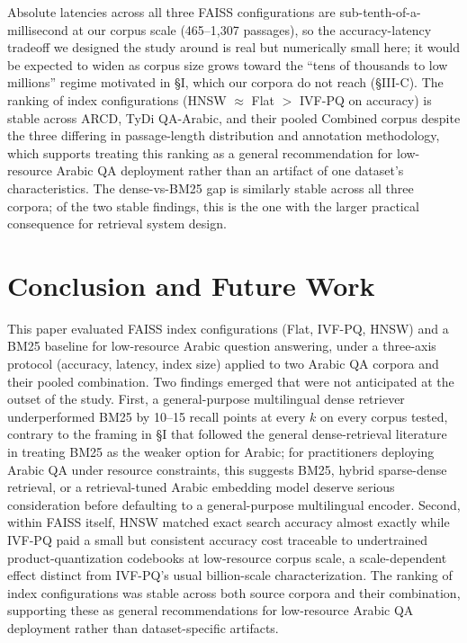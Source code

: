 \documentclass[conference]{IEEEtran}
\begin{document}
Absolute latencies across all three FAISS configurations are sub-tenth-of-a-millisecond at our corpus scale (465--1{,}307 passages), so the accuracy-latency tradeoff we designed the study around is real but numerically small here; it would be expected to widen as corpus size grows toward the ``tens of thousands to low millions'' regime motivated in \S I, which our corpora do not reach (\S III-C). The ranking of index configurations (HNSW $\approx$ Flat $>$ IVF-PQ on accuracy) is stable across ARCD, TyDi QA-Arabic, and their pooled Combined corpus despite the three differing in passage-length distribution and annotation methodology, which supports treating this ranking as a general recommendation for low-resource Arabic QA deployment rather than an artifact of one dataset's characteristics. The dense-vs-BM25 gap is similarly stable across all three corpora; of the two stable findings, this is the one with the larger practical consequence for retrieval system design.

\section{Conclusion and Future Work}

This paper evaluated FAISS index configurations (Flat, IVF-PQ, HNSW) and a BM25 baseline for low-resource Arabic question answering, under a three-axis protocol (accuracy, latency, index size) applied to two Arabic QA corpora and their pooled combination. Two findings emerged that were not anticipated at the outset of the study. First, a general-purpose multilingual dense retriever underperformed BM25 by 10--15 recall points at every $k$ on every corpus tested, contrary to the framing in \S I that followed the general dense-retrieval literature in treating BM25 as the weaker option for Arabic; for practitioners deploying Arabic QA under resource constraints, this suggests BM25, hybrid sparse-dense retrieval, or a retrieval-tuned Arabic embedding model deserve serious consideration before defaulting to a general-purpose multilingual encoder. Second, within FAISS itself, HNSW matched exact search accuracy almost exactly while IVF-PQ paid a small but consistent accuracy cost traceable to undertrained product-quantization codebooks at low-resource corpus scale, a scale-dependent effect distinct from IVF-PQ's usual billion-scale characterization. The ranking of index configurations was stable across both source corpora and their combination, supporting these as general recommendations for low-resource Arabic QA deployment rather than dataset-specific artifacts.
\end{document}
